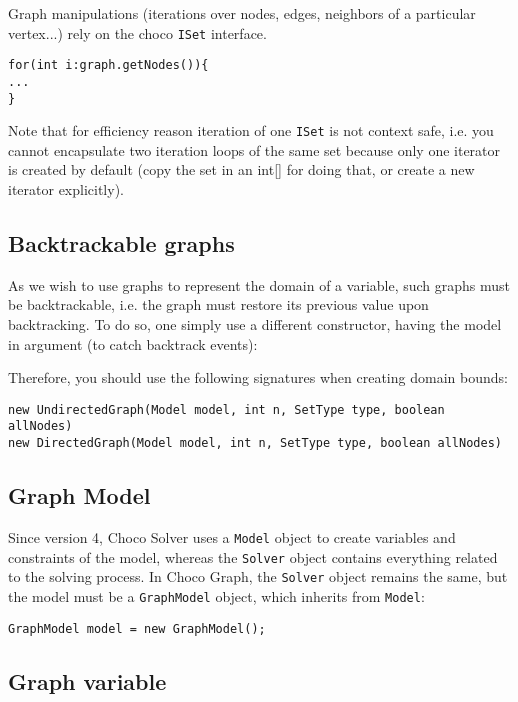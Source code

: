 \documentclass{article}
\begin{document}
Graph manipulations (iterations over nodes, edges, neighbors of a particular vertex...) rely on the choco \texttt{ISet} interface. 
\begin{lstlisting}
for(int i:graph.getNodes()){
...
}
\end{lstlisting}
Note that for efficiency reason iteration of one \texttt{ISet} is not context safe, i.e. you cannot encapsulate two iteration loops of the same set because only one iterator is created by default (copy the set in an int[] for doing that, or create a new iterator explicitly).
\subsection{Backtrackable graphs}

As we wish to use graphs to represent the domain of a variable, such graphs must be backtrackable, i.e. the graph must restore its previous value upon backtracking. 
To do so, one simply use a different constructor, having the model in argument (to catch backtrack events):

Therefore, you should use the following signatures when creating domain bounds:
\begin{lstlisting}
new UndirectedGraph(Model model, int n, SetType type, boolean allNodes)
new DirectedGraph(Model model, int n, SetType type, boolean allNodes)
\end{lstlisting}

\subsection{Graph Model}

Since version 4, Choco Solver uses a \texttt{Model} object to create variables and constraints of the model, whereas the \texttt{Solver} object contains everything related to the solving process. In Choco Graph, the \texttt{Solver} object remains the same, but the model must be a \texttt{GraphModel} object, which inherits from \texttt{Model}:

\begin{lstlisting}
GraphModel model = new GraphModel();
\end{lstlisting}

\subsection{Graph variable}
\end{document}
